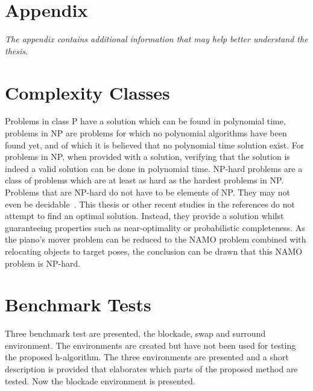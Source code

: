 \chapter*{Appendix}%

\appendix

\textit{The appendix contains additional information that may help better understand the thesis.\bs}

\chapter*{Complexity Classes}%
Problems in class P have a solution which can be found in polynomial time, problems in \ac{NP} are problems for which no polynomial algorithms have been found yet, and of which it is believed that no polynomial time solution exist. For problems in \ac{NP}, when provided with a solution, verifying that the solution is indeed a valid solution can be done in polynomial time. \ac{NP-hard} problems are a class of problems which are at least as hard as the hardest problems in \ac{NP}. Problems that are \ac{NP-hard} do not have to be elements of NP. They may not even be decidable~\cite{pokharel_computational_2020}. This thesis or other recent studies in the references do not attempt to find an optimal solution. Instead, they provide a solution whilst guaranteeing properties such as near-optimality or probabilistic completeness. As the piano's mover problem can be reduced to the \ac{NAMO} problem combined with relocating objects to target poses, the conclusion can be drawn that this \ac{NAMO} problem is \ac{NP-hard}.\bs

\chapter*{Benchmark Tests}%
Three benchmark test are presented, the blockade, swap and surround environment. The environments are created but have not been used for testing the proposed \ac{h-algorithm}. The three environments are presented and a short description is provided that elaborates which parts of the proposed method are tested. Now the blockade environment is presented.\bs


